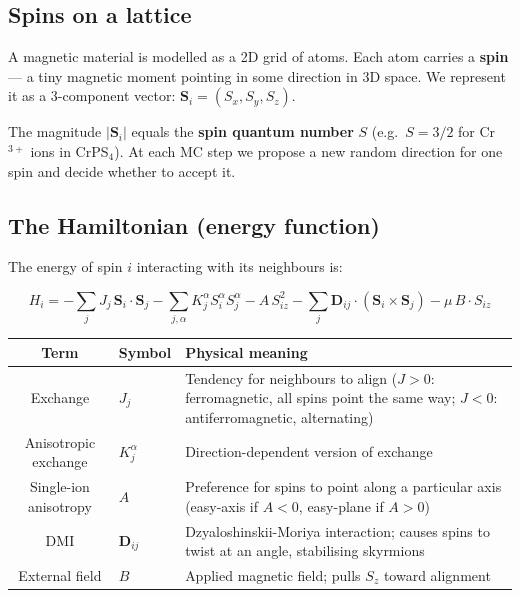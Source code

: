 \documentclass[12pt,a4paper]{article}
\begin{document}
\subsection{Spins on a lattice}

A magnetic material is modelled as a 2D grid of atoms. Each atom carries a
\textbf{spin} --- a tiny magnetic moment pointing in some direction in 3D
space. We represent it as a 3-component vector:
$\mathbf{S}_i = (S_x, S_y, S_z)$.

The magnitude $|\mathbf{S}_i|$ equals the \textbf{spin quantum number} $S$
(e.g.\ $S = 3/2$ for Cr$^{3+}$ ions in CrPS$_4$). At each MC step we
propose a new random direction for one spin and decide whether to accept it.

\subsection{The Hamiltonian (energy function)}

The energy of spin $i$ interacting with its neighbours is:

\begin{equation}
  H_i = -\sum_j J_j\, \mathbf{S}_i \cdot \mathbf{S}_j
        - \sum_{j,\alpha} K_j^\alpha S_i^\alpha S_j^\alpha
        - A \, S_{iz}^2
        - \sum_j \mathbf{D}_{ij} \cdot (\mathbf{S}_i \times \mathbf{S}_j)
        - \mu\, B \cdot S_{iz}
  \label{eq:hamiltonian}
\end{equation}

\begin{center}
\begin{tabular}{clp{8cm}}
\toprule
\textbf{Term} & \textbf{Symbol} & \textbf{Physical meaning} \\
\midrule
Exchange & $J_j$ & Tendency for neighbours to align ($J>0$: ferromagnetic,
                    all spins point the same way; $J<0$: antiferromagnetic,
                    alternating) \\
Anisotropic exchange & $K_j^\alpha$ & Direction-dependent version of exchange \\
Single-ion anisotropy & $A$ & Preference for spins to point along a particular
                              axis (easy-axis if $A<0$, easy-plane if $A>0$) \\
DMI & $\mathbf{D}_{ij}$ & Dzyaloshinskii-Moriya interaction; causes spins to
                           twist at an angle, stabilising skyrmions \\
External field & $B$ & Applied magnetic field; pulls $S_z$ toward alignment \\
\bottomrule
\end{tabular}
\end{center}
\end{document}
